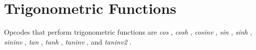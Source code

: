 \begin{comment}
\documentclass[10pt]{article}
\usepackage{fullpage, graphicx, url}
\setlength{\parskip}{1ex}
\setlength{\parindent}{0ex}
\title{Trigonometric Functions}



\begin{tabular}{ccc}
The Alternative Csound Reference Manual & & \\
Previous &Mathematical Operations &Next

\end{tabular}

\end{comment}
\section{Trigonometric Functions}


  Opcodes that perform trigonometric functions are \emph{cos}
, \emph{cosh}
, \emph{cosinv}
, \emph{sin}
, \emph{sinh}
, \emph{sininv}
, \emph{tan}
, \emph{tanh}
, \emph{taninv}
, and \emph{taninv2}
. 


\begin{comment}
\begin{tabular}{lcr}
Previous &Home &Next \\
Random Functions &Up &MIDI Support

\end{tabular}



\end{comment}
